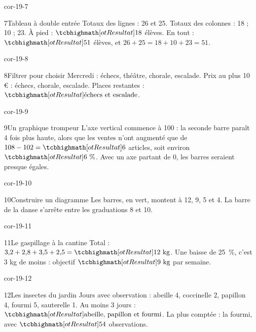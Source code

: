 \begin{blocLivre}{cor-19-7}\begin{corrige}{7}{Tableau à double entrée}
Totaux des lignes : 26 et 25. Totaux des colonnes : 18 ; 10 ; 23. À pied : $\res{18}$ élèves. En tout : $\res{51}$ élèves, et $26+25=18+10+23=51$.
\end{corrige}\end{blocLivre}
\begin{blocLivre}{cor-19-8}\begin{corrige}{8}{Filtrer pour choisir}
Mercredi : échecs, théâtre, chorale, escalade. Prix au plus 10 € : échecs, chorale, escalade. Places restantes : $\res{\text{échecs et escalade}}$.
\end{corrige}\end{blocLivre}
\begin{blocLivre}{cor-19-9}\begin{corrige}{9}{Un graphique trompeur}
L’axe vertical commence à 100 : la seconde barre paraît 4 fois plus haute, alors que les ventes n’ont augmenté que de $108-102=\res6$ articles, soit environ $\res{6\text{~\%}}$. Avec un axe partant de 0, les barres seraient presque égales.
\label{fig-cor-19-9}
\end{corrige}\end{blocLivre}
\begin{blocLivre}{cor-19-10}\begin{corrige}{10}{Construire un diagramme}
Les barres, en vert, montent à 12, 9, 5 et 4. La barre de la danse s’arrête entre les graduations 8 et 10.
\label{fig-cor-19-10}
\end{corrige}\end{blocLivre}
\begin{blocLivre}{cor-19-11}\begin{corrige}{11}{Le gaspillage à la cantine}
Total : $3{,}2+2{,}8+3{,}5+2{,}5=\res{12\ \mathrm{kg}}$. Une baisse de 25~\%, c’est 3 kg de moins : objectif $\res{9\ \mathrm{kg}}$ par semaine.
\end{corrige}\end{blocLivre}
\begin{blocLivre}{cor-19-12}\begin{corrige}{12}{Les insectes du jardin}
Jours avec observation : abeille 4, coccinelle 2, papillon 4, fourmi 5, sauterelle 1. Au moins 3 jours : $\res{\text{abeille, papillon et fourmi}}$. La plus comptée : la fourmi, avec $\res{54}$ observations.
\end{corrige}\end{blocLivre}
